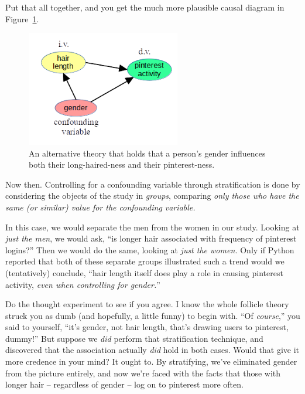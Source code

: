 Put that all together, and you get the much more plausible causal diagram in
Figure~\ref{fig:hairPinterest2}.

\begin{figure}[ht]
\centering
\includegraphics[width=0.6\textwidth]{hairPinterest2.png}
\caption{An alternative theory that holds that a person's gender influences
both their long-haired-ness and their pinterest-ness.}
\label{fig:hairPinterest2}
\end{figure}



Now then. Controlling for a confounding variable through stratification is done
by considering the objects of the study in \textit{groups}, comparing
\textit{only those who have the same (or similar) value for the confounding
variable.}

In this case, we would separate the men from the women in our study. Looking at
\textit{just the men}, we would ask, ``is longer hair associated with frequency
of pinterest logins?'' Then we would do the same, looking at \textit{just the
women.} Only if Python reported that both of these separate groups illustrated
such a trend would we (tentatively) conclude, ``hair length itself does play a
role in causing pinterest activity, \textit{even when controlling for
gender.}''

Do the thought experiment to see if you agree. I know the whole follicle theory
struck you as dumb (and hopefully, a little funny) to begin with. ``Of
\textit{course},'' you said to yourself, ``it's gender, not hair length, that's
drawing users to pinterest, dummy!'' But suppose we \textit{did} perform that
stratification technique, and discovered that the association actually
\textit{did} hold in both cases. Would that give it more credence in your mind?
It ought to. By stratifying, we've eliminated gender from the picture entirely,
and now we're faced with the facts that those with longer hair -- regardless of
gender -- log on to pinterest more often. 


